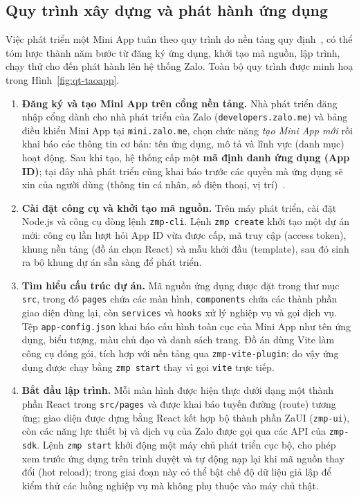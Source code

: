 \documentclass[../main.tex]{subfiles}
\begin{document}
\subsection{Quy trình xây dựng và phát hành ứng dụng}
\label{sec:zalo-quytrinh}

Việc phát triển một Mini App tuân theo quy trình do nền tảng quy định~\cite{zmpdocs}, có thể
tóm lược thành năm bước từ đăng ký ứng dụng, khởi tạo mã nguồn, lập trình, chạy thử cho đến
phát hành lên hệ thống Zalo. Toàn bộ quy trình được minh hoạ trong Hình~\ref{fig:qt-taoapp}.

\begin{enumerate}[leftmargin=1.6em]
  \item \textbf{Đăng ký và tạo Mini App trên cổng nền tảng.} Nhà phát triển đăng nhập cổng dành
  cho nhà phát triển của Zalo (\texttt{developers.zalo.me}) và bảng điều khiển Mini App tại
  \texttt{mini.zalo.me}, chọn chức năng \textit{tạo Mini App mới} rồi khai báo các thông tin cơ
  bản: tên ứng dụng, mô tả và lĩnh vực (danh mục) hoạt động. Sau khi tạo, hệ thống cấp một
  \textbf{mã định danh ứng dụng (App ID)}; tại đây nhà phát triển cũng khai báo trước các quyền
  mà ứng dụng sẽ xin của người dùng (thông tin cá nhân, số điện thoại, vị trí)~\cite{zalominiapp}.

  \item \textbf{Cài đặt công cụ và khởi tạo mã nguồn.} Trên máy phát triển, cài đặt Node.js và
  công cụ dòng lệnh \texttt{zmp-cli}. Lệnh \texttt{zmp create} khởi tạo một dự án mới: công cụ
  lần lượt hỏi App ID vừa được cấp, mã truy cập (access token), khung nền tảng (đồ án chọn React)
  và mẫu khởi đầu (template), sau đó sinh ra bộ khung dự án sẵn sàng để phát triển.

  \item \textbf{Tìm hiểu cấu trúc dự án.} Mã nguồn ứng dụng được đặt trong thư mục \texttt{src},
  trong đó \texttt{pages} chứa các màn hình, \texttt{components} chứa các thành phần giao diện
  dùng lại, còn \texttt{services} và \texttt{hooks} xử lý nghiệp vụ và gọi dịch vụ. Tệp
  \texttt{app-config.json} khai báo cấu hình toàn cục của Mini App như tên ứng dụng, biểu tượng,
  màu chủ đạo và danh sách trang. Đồ án dùng Vite làm công cụ đóng gói, tích hợp với nền tảng
  qua \texttt{zmp-vite-plugin}; do vậy ứng dụng được chạy bằng \texttt{zmp start} thay vì gọi
  \texttt{vite} trực tiếp.

  \item \textbf{Bắt đầu lập trình.} Mỗi màn hình được hiện thực dưới dạng một thành phần React
  trong \texttt{src/pages} và được khai báo tuyến đường (route) tương ứng; giao diện được dựng
  bằng React kết hợp bộ thành phần ZaUI (\texttt{zmp-ui}), còn các năng lực thiết bị và dịch vụ
  của Zalo được gọi qua các API của \texttt{zmp-sdk}. Lệnh \texttt{zmp start} khởi động một máy
  chủ phát triển cục bộ, cho phép xem trước ứng dụng trên trình duyệt và tự động nạp lại khi mã
  nguồn thay đổi (hot reload); trong giai đoạn này có thể bật chế độ dữ liệu giả lập để kiểm thử
  các luồng nghiệp vụ mà không phụ thuộc vào máy chủ thật.


\end{enumerate}
\end{document}
